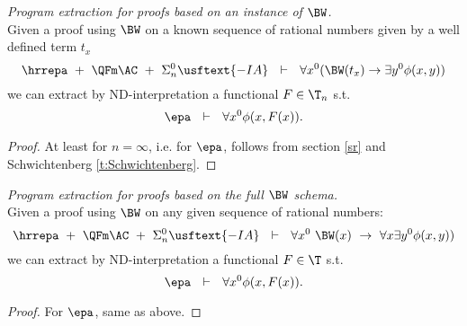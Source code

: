 \begin{thm}{\em Program extraction for proofs based on an instance of $\BW$.\\} Given a proof 
using $\BW$ on a known sequence of rational numbers given by a well defined term $t_x$
\[
\hrrepa\ +\ \QFm\AC\ +\ \Sigma^0_n\usftext{-IA}\ \ \vdash\ \ 
    \forall x^0(\BW(t_x)\rightarrow\exists y^0 \phi(x,y))
\]
we can extract by ND-interpretation a functional $F\in\T_n$ s.t.
\[
\epa\ \ \vdash\ \ \forall x^0 \phi(x,F(x)) \text{.}
\]
\end{thm}
\begin{proof}
At least for $n=\infty$, i.e. for $\epa$, follows from section \ref{sr} and 
Schwichtenberg \ref{t:Schwichtenberg}.
\end{proof}

\begin{thm}{\em Program extraction for proofs based on the full $\BW$ schema.\\} Given a proof 
using $\BW$ on any given sequence of rational numbers:
\[
\hrrepa\ +\ \QFm\AC\ +\ \Sigma^0_n\usftext{-IA}\ \ \vdash\ \ 
    \forall x^0\ \BW(x)\ \rightarrow\ \forall x\exists y^0 \phi(x,y))
\]
we can extract by ND-interpretation a functional $F\in\T$ s.t.
\[
\epa\ \ \vdash\ \ \forall x^0 \phi(x,F(x)) \text{.}
\]
\end{thm}
\begin{proof}
For $\epa$, same as above.
\end{proof}
